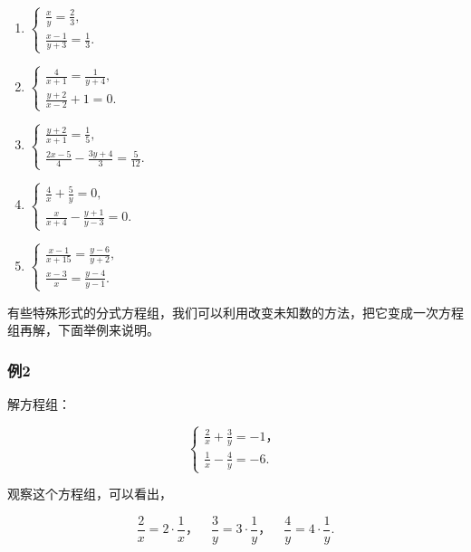 \begin{enumerate}[start=1]
\item
  \(\left\{ \begin{array}{l} \frac{x}{y} = \frac{2}{3}, \\ \frac{x - 1}{y + 3} = \frac{1}{3}. \end{array} \right.\)
\item
  \(\left\{ \begin{array}{l} \frac{4}{x + 1} = \frac{1}{y + 4}, \\ \frac{y + 2}{x - 2} + 1 = 0. \end{array} \right.\)
\item
  \(\left\{ \begin{array}{l} \frac{y + 2}{x + 1} = \frac{1}{5}, \\ \frac{2x - 5}{4} - \frac{3y + 4}{3} = \frac{5}{12}. \end{array} \right.\)
\item
  \(\left\{ \begin{array}{l} \frac{4}{x} + \frac{5}{y} = 0, \\ \frac{x}{x + 4} - \frac{y + 1}{y - 3} = 0. \end{array} \right.\)
\item
  \(\left\{ \begin{array}{l} \frac{x - 1}{x + 15} = \frac{y - 6}{y + 2}, \\ \frac{x - 3}{x} = \frac{y - 4}{y - 1}. \end{array} \right.\)
\end{enumerate}

有些特殊形式的分式方程组，我们可以利用改变未知数的方法，把它变成一次方程组再解，下面举例来说明。

\subsubsection{例2}

解方程组：

\[
\left\{ \begin{array}{l} \frac{2}{x} + \frac{3}{y} = - 1\text{，} \\ \frac{1}{x} - \frac{4}{y} = - 6. \end{array} \right. \tag{1}
\]

 观察这个方程组，可以看出，

\[
\frac{2}{x} = 2 \cdot \frac{1}{x}\text{，} \quad \frac{3}{y} = 3 \cdot \frac{1}{y}\text{，} \quad \frac{4}{y} = 4 \cdot \frac{1}{y}.
\]

